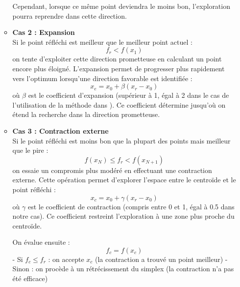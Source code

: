 \begin{enumerate}
\begin{itemize}
       \begin{InfoBox}
            Cependant, lorsque ce même point deviendra le moins bon, l'exploration pourra reprendre dans cette direction.
       \end{InfoBox}

\vspace{1em}
    
       \item \textbf{Cas 2 : Expansion} \\
       Si le point réfléchi est meilleur que le meilleur point actuel :
       \begin{equation}
       f_r < f(x_1)
       \end{equation}
       on tente d'exploiter cette direction prometteuse en calculant un point encore plus éloigné. L'expansion permet de progresser plus rapidement vers l'optimum lorsqu'une direction favorable est identifiée :
       \begin{equation}
       x_e = x_0 + \beta (x_r - x_0)
       \end{equation}
       où $\beta$ est le coefficient d'expansion (supérieur à 1, égal à 2 dans le cas de l'utilisation de la méthode  dans ). Ce coefficient détermine jusqu'où on étend la recherche dans la direction prometteuse.
       
\vspace{1em}
    
       \item \textbf{Cas 3 : Contraction externe} \\
       Si le point réfléchi est moins bon que la plupart des points mais meilleur que le pire :
       \begin{equation}
       f(x_N) \leq f_r < f(x_{N+1})
       \end{equation}
       on essaie un compromis plus modéré en effectuant une contraction externe. Cette opération permet d'explorer l'espace entre le centroïde et le point réfléchi :
       \begin{equation}
       x_c = x_0 + \gamma (x_r - x_0)
       \end{equation}
       où $\gamma$ est le coefficient de contraction (compris entre 0 et 1, égal à 0.5 dans notre cas). Ce coefficient restreint l'exploration à une zone plus proche du centroïde.
       
       On évalue ensuite :
       \begin{equation}
       f_c = f(x_c)
       \end{equation}
       - Si $f_c \leq f_r$ : on accepte $x_c$ (la contraction a trouvé un point meilleur)
       - Sinon : on procède à un rétrécissement du simplex (la contraction n'a pas été efficace)


\end{itemize}
\end{enumerate}
